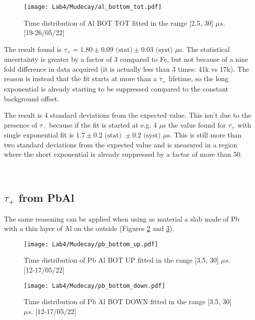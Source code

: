 \documentclass[10pt,a4paper,twocolumn]{article}
\begin{document}
\begin{figure}[h!]
\centering
\caption{Time distribution of Al BOT TOT fitted in the range [2.5, 30] $\mu s$. [19-26/05/22]}
\texttt{[image: Lab4/Mudecay/al\_bottom\_tot.pdf]} 
\label{ALTOT}
\end{figure}



The result found is $\tau_+=1.80 \pm 0.09 \text{ (stat)} \pm 0.03\text{ (syst) }\mu$s. The statistical uncertainty is greater by a factor of 3 compared to Fe, but not because of a nine fold difference in data acquired (it is actually less than 3 times: 41k vs 17k). The reason is instead that the fit starts at more than a $\tau_+$ lifetime, so the long exponential is already starting to be suppressed compared to the constant background offset. 

The result is 4 standard deviations from the expected value. This isn't due to the presence of $\tau_-$ because if the fit is started at e.g. 4 $\mu$s the value found for $\tau_+$ with single exponential fit is $1.7 \pm 0.2 \text{ (stat) } \pm 0.2\text{ (syst) }\mu$s. This is still more than two standard deviations from the expected value and is measured in a region where the short exponential is already suppressed by a factor of more than 50.

\\


\subsection{$\tau_+$ from PbAl}

The same reasoning can be applied when using as material a slab made of Pb with a thin layer of Al on the outside (Figures \ref{PBALUP} and \ref{PBALDWN}). 

\begin{figure}[h!]
\centering
\caption{Time distribution of Pb Al BOT UP fitted in the range [3.5, 30] $\mu s$. [12-17/05/22]}
\texttt{[image: Lab4/Mudecay/pb\_bottom\_up.pdf]} 
\label{PBALUP}
\end{figure}

\begin{figure}[h!]
\centering
\caption{Time distribution of Pb Al BOT DOWN fitted in the range [3.5, 30] $\mu s$. [12-17/05/22]}
\texttt{[image: Lab4/Mudecay/pb\_bottom\_down.pdf]} 
\label{PBALDWN}
\end{figure}
\end{document}
